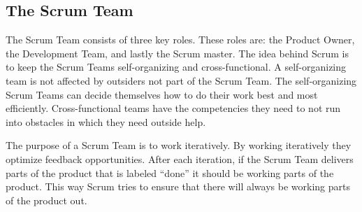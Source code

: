 \subsection{The Scrum Team}

The Scrum Team consists of three key roles. These roles are: the Product Owner, the 
Development Team, and lastly the Scrum master\cite{scrumguide11}. The idea behind Scrum is 
to keep the Scrum Teams self-organizing and cross-functional. A self-organizing team is not 
affected by outsiders not part of the Scrum Team. The self-organizing 
Scrum Teams can decide themselves how to do their work best and most 
efficiently. Cross-functional teams have the competencies they need to not 
run into obstacles in which they need outside help\cite{scrumguide11}.


The purpose of a Scrum Team is to work iteratively. By working
iteratively they optimize feedback opportunities. After each iteration,
if the Scrum Team delivers parts of the product that is labeled ``done'' it
should be working parts of the product. This way Scrum tries to ensure
that there will always be working parts of the product out\cite{scrumguide11}.



